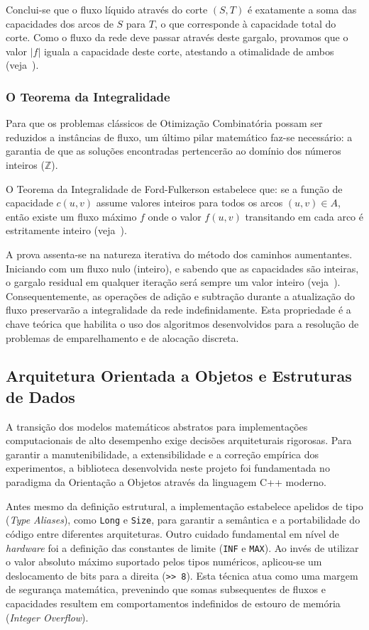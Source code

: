 \documentclass[12pt,a4paper]{article}
\begin{document}
Conclui-se que o fluxo líquido através do corte $(S, T)$ é exatamente a soma das capacidades dos arcos de $S$ para $T$, o que corresponde à capacidade total do corte. Como o fluxo da rede deve passar através deste gargalo, provamos que o valor $|f|$ iguala a capacidade deste corte, atestando a otimalidade de ambos (veja~\cite{ford1956maximal}).

\subsubsection{O Teorema da Integralidade}

Para que os problemas clássicos de Otimização Combinatória possam ser reduzidos a instâncias de fluxo, um último pilar matemático faz-se necessário: a garantia de que as soluções encontradas pertencerão ao domínio dos números inteiros ($\mathbb{Z}$).

O Teorema da Integralidade de Ford-Fulkerson estabelece que: se a função de capacidade $c(u,v)$ assume valores inteiros para todos os arcos $(u,v) \in A$, então existe um fluxo máximo $f$ onde o valor $f(u,v)$ transitando em cada arco é estritamente inteiro (veja~\cite{ford1956maximal}).

A prova assenta-se na natureza iterativa do método dos caminhos aumentantes. Iniciando com um fluxo nulo (inteiro), e sabendo que as capacidades são inteiras, o gargalo residual em qualquer iteração será sempre um valor inteiro (veja~\cite{ahuja1993network}). Consequentemente, as operações de adição e subtração durante a atualização do fluxo preservarão a integralidade da rede indefinidamente. Esta propriedade é a chave teórica que habilita o uso dos algoritmos desenvolvidos para a resolução de problemas de emparelhamento e de alocação discreta.

\subsection{Arquitetura Orientada a Objetos e Estruturas de Dados}

A transição dos modelos matemáticos abstratos para implementações computacionais de alto desempenho exige decisões arquiteturais rigorosas. Para garantir a manutenibilidade, a extensibilidade e a correção empírica dos experimentos, a biblioteca desenvolvida neste projeto foi fundamentada no paradigma da Orientação a Objetos através da linguagem C++ moderno.

Antes mesmo da definição estrutural, a implementação estabelece apelidos de tipo (\textit{Type Aliases}), como \lstinline{Long} e \lstinline{Size}, para garantir a semântica e a portabilidade do código entre diferentes arquiteturas. Outro cuidado fundamental em nível de \textit{hardware} foi a definição das constantes de limite (\lstinline{INF} e \lstinline{MAX}). Ao invés de utilizar o valor absoluto máximo suportado pelos tipos numéricos, aplicou-se um deslocamento de bits para a direita (\lstinline{>> 8}). Esta técnica atua como uma margem de segurança matemática, prevenindo que somas subsequentes de fluxos e capacidades resultem em comportamentos indefinidos de estouro de memória (\textit{Integer Overflow}).
\end{document}
